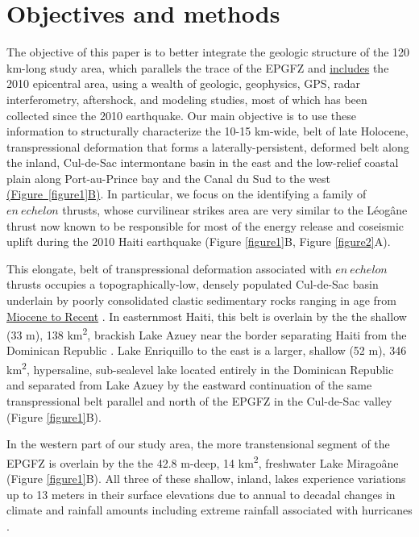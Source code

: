 \documentclass[linenumbers,draft]{agujournal}
\begin{document}
\section{Objectives and methods}
The objective of this paper is to better integrate the geologic structure of the 120 km-long study area, which parallels the trace of the EPGFZ and \ul{includes} the 2010 epicentral area, using a wealth of geologic, geophysics, GPS, radar interferometry, aftershock, and modeling studies, most of which has been collected since the 2010 earthquake. Our main objective is to use these information to structurally characterize the 10-15 km-wide, belt of late Holocene, transpressional deformation that forms a laterally-persistent, deformed belt along the inland, Cul-de-Sac intermontane basin in the east and the low-relief coastal plain along Port-au-Prince bay and the Canal du Sud to the west \underline{(Figure~\ref{figure1}B)}. In particular, we focus on the identifying a family of $en~echelon$ thrusts, whose curvilinear strikes area are very similar to the L\'eog\^ane thrust now known to be responsible for most of the energy release and coseismic uplift during the 2010 Haiti earthquake \citep{calais2010transpressional,douilly2013crustal,douilly2015three} (Figure \ref{figure1}B, Figure \ref{figure2}A).

This elongate, belt of transpressional deformation associated with $en~echelon$ thrusts occupies a topographically-low, densely populated Cul-de-Sac basin underlain by poorly consolidated clastic sedimentary rocks ranging in age from \ul{Miocene to Recent} \citep{massoni1955haiti,mann1995actively,terrier2014revision,saint2015seismotectonics}. In easternmost Haiti, this belt is overlain by the the shallow (33 m), 138 km\textsuperscript{2}, brackish Lake Azuey near the border separating Haiti from the Dominican Republic \citep{wright2015factors,piasecki2016bathymetric}. Lake Enriquillo to the east is a larger, shallow (52 m), 346 km\textsuperscript{2}, hypersaline, sub-sealevel lake located entirely in the Dominican Republic and separated from Lake Azuey by the eastward continuation of the same transpressional belt parallel and north of the EPGFZ in the Cul-de-Sac valley \citep{mann1995actively} (Figure \ref{figure1}B). 

In the western part of our study area, the more transtensional segment of the EPGFZ is overlain by the the 42.8 m-deep, 14 km\textsuperscript{2}, freshwater Lake Mirago\^ane (Figure \ref{figure1}B). All three of these shallow, inland, lakes experience variations up to 13 meters in their surface elevations due to annual to decadal changes in climate and rainfall amounts including extreme rainfall associated with hurricanes \citep{wright2015factors,piasecki2016bathymetric,moknatian2017development,rico2017hydrodynamic}.  
  
\end{document}
